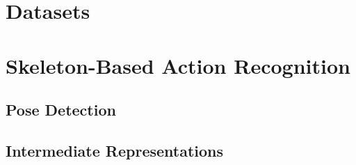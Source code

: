 \section{Datasets}

\section{Skeleton-Based Action Recognition}

\subsection{Pose Detection}

\subsection{Intermediate Representations}
